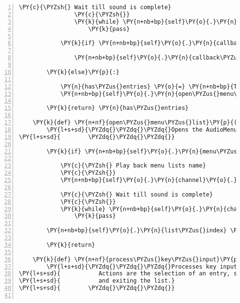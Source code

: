 \begin{Verbatim}[commandchars=\\\{\},numbers=left,firstnumber=1,stepnumber=1]
                \PY{c}{\PYZsh{} Wait till sound is complete}
                \PY{c}{\PYZsh{}}
                \PY{k}{while} \PY{n+nb+bp}{self}\PY{o}{.}\PY{n}{channel}\PY{o}{.}\PY{n}{get\PYZus{}busy}\PY{p}{(}\PY{p}{)}\PY{p}{:}
                    \PY{k}{pass}

            \PY{k}{if} \PY{n+nb+bp}{self}\PY{o}{.}\PY{n}{callback\PYZus{}on\PYZus{}exit} \PY{o+ow}{is} \PY{o+ow}{not} \PY{n+nb+bp}{None}\PY{p}{:}

                \PY{n+nb+bp}{self}\PY{o}{.}\PY{n}{callback\PYZus{}on\PYZus{}exit}\PY{p}{(}\PY{n+nb+bp}{self}\PY{p}{)}

        \PY{k}{else}\PY{p}{:}

            \PY{n}{has\PYZus{}entries} \PY{o}{=} \PY{n+nb+bp}{True}
            \PY{n+nb+bp}{self}\PY{o}{.}\PY{n}{open\PYZus{}menu\PYZus{}list}\PY{p}{(}\PY{p}{)}

        \PY{k}{return} \PY{n}{has\PYZus{}entries}

    \PY{k}{def} \PY{n+nf}{open\PYZus{}menu\PYZus{}list}\PY{p}{(}\PY{n+nb+bp}{self}\PY{p}{)}\PY{p}{:}
        \PY{l+s+sd}{\PYZdq{}\PYZdq{}\PYZdq{}Opens the AudioMenuList by playing its menu\PYZus{}sound as title and sets the index to the first entry.}
\PY{l+s+sd}{        \PYZdq{}\PYZdq{}\PYZdq{}}

        \PY{k}{if} \PY{n+nb+bp}{self}\PY{o}{.}\PY{n}{menu\PYZus{}sound} \PY{o+ow}{is} \PY{o+ow}{not} \PY{n+nb+bp}{None}\PY{p}{:}

            \PY{c}{\PYZsh{} Play back menu lists name}
            \PY{c}{\PYZsh{}}
            \PY{n+nb+bp}{self}\PY{o}{.}\PY{n}{channel}\PY{o}{.}\PY{n}{play}\PY{p}{(}\PY{n+nb+bp}{self}\PY{o}{.}\PY{n}{menu\PYZus{}sound}\PY{p}{)}

            \PY{c}{\PYZsh{} Wait till sound is complete}
            \PY{c}{\PYZsh{}}
            \PY{k}{while} \PY{n+nb+bp}{self}\PY{o}{.}\PY{n}{channel}\PY{o}{.}\PY{n}{get\PYZus{}busy}\PY{p}{(}\PY{p}{)}\PY{p}{:}
                \PY{k}{pass}

        \PY{n+nb+bp}{self}\PY{o}{.}\PY{n}{list\PYZus{}index} \PY{o}{=} \PY{l+m+mi}{0}

        \PY{k}{return}

    \PY{k}{def} \PY{n+nf}{process\PYZus{}key\PYZus{}input}\PY{p}{(}\PY{n+nb+bp}{self}\PY{p}{,} \PY{n}{key}\PY{p}{)}\PY{p}{:}
        \PY{l+s+sd}{\PYZdq{}\PYZdq{}\PYZdq{}Processes key input and performs the corresponding action on the AudioMenuList.}
\PY{l+s+sd}{           Actions are the selection of an entry, scrolling entries up and down}
\PY{l+s+sd}{           and exiting the list.}
\PY{l+s+sd}{        \PYZdq{}\PYZdq{}\PYZdq{}}


\end{Verbatim}
